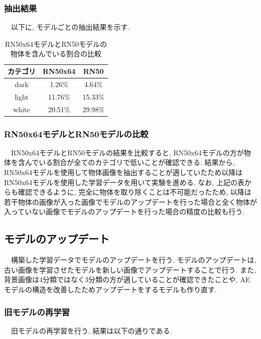 \documentclass[a4paper, 12pt]{report}
\begin{document}
\subsubsection{抽出結果}
　以下に, モデルごとの抽出結果を示す. 

\begin{table}[H]
    \centering
    \caption{RN50x64モデルとRN50モデルの物体を含んでいる割合の比較}
    \label{tab:model_comparison}
    \begin{tabular}{|c|c|c|}
        \hline
        カテゴリ & RN50x64 & RN50 \\
        \hline
        dark & 1.26\% & 4.64\% \\
        \hline
        light & 11.76\% & 15.33\% \\
        \hline
        white & 20.51\% & 29.98\% \\
        \hline
    \end{tabular}
\end{table}

\subsubsection{RN50x64モデルとRN50モデルの比較}
　RN50x64モデルとRN50モデルの結果を比較すると, RN50x64モデルの方が物体を含んでいる割合が全てのカテゴリで低いことが確認できる. 
結果から, RN50x64モデルを使用して物体画像を抽出することが適していたため以降はRN50x64モデルを使用した学習データを用いて実験を進める. 
なお, 上記の表からも確認できるように, 完全に物体を取り除くことは不可能だったため, 以降は若干物体の画像が入った画像でモデルのアップデートを行った場合と全く物体が入っていない画像でモデルのアップデートを行った場合の精度の比較も行う. 

\subsection{モデルのアップデート}
　構築した学習データでモデルのアップデートを行う. モデルのアップデートは, 古い画像を学習させたモデルを新しい画像でアップデートすることで行う. 
また, 背景画像は4分類ではなく3分類の方が適していることが確認できたことや, AEモデルの構造を改善したためアップデートをするモデルも作り直す. 

\subsubsection{旧モデルの再学習}
　旧モデルの再学習を行う. 結果は以下の通りである. \\
\end{document}
